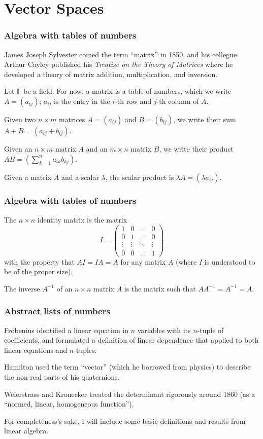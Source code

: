 \documentclass{beamer}
\theoremstyle{definition}
\begin{document}
\section{Vector Spaces}

\begin{frame}
    \frametitle{Algebra with tables of numbers}

    James Joseph Sylvester coined the term ``matrix'' in 1850, and his collegue Arthur Cayley published his \textit{Treatise on the Theory of Matrices}
    where he developed a theory of matrix addition, multiplication, and inversion.

    \pause
    Let $\mathbb{F}$ be a field. For now, a matrix is a table of numbers, which we write $A = (a_{ij})$; $a_{ij}$ is the entry in the $i$-th row and $j$-th column
    of $A$.

    \pause
    Given two $n \times m$ matrices $A = (a_{ij})$ and $B = (b_{ij})$, we write their sum $A + B = (a_{ij} + b_{ij})$.

    \pause
    Given an $n \times m$ matrix $A$ and an $m \times n$ matrix $B$, we write their product $AB = \left( \sum_{k=1}^n a_{ik} b_{kj} \right)$.

    \pause
    Given a matrix $A$ and a scalar $\lambda$, the scalar product is $\lambda A = (\lambda a_{ij})$.
\end{frame}

\begin{frame}
    \frametitle{Algebra with tables of numbers}

    The $n \times n$ identity matrix is the matrix
    \[
        I = \begin{pmatrix}
            1 & 0 & \ldots & 0 \\
            0 & 1 & \ldots & 0 \\
            \vdots & \vdots & \ddots & \vdots \\
            0 & 0 & \ldots & 1
        \end{pmatrix}  
    \]
    with the property that $AI = IA = A$ for any matrix $A$ (where $I$ is understood to be of the proper size).

    The inverse $A^{-1}$ of an $n \times n$ matrix $A$ is the matrix such that $A A^{-1} = A^{-1} = A$.
\end{frame}

\begin{frame}
    \frametitle{Abstract lists of numbers}
    Frobenius identified a linear equation in $n$ variables with its $n$-tuple of coefficients, and formulated a definition of linear dependence that
    applied to both linear equations and $n$-tuples.

    \pause
    Hamilton used the term ``vector'' (which he borrowed from physics) to describe the non-real parts of his quaternions.

    \pause
    Weierstrass and Kronecker treated the determinant rigorously around 1860 (as a ``normed, linear, homogeneous function'')\cite{hist-alg}.

    \pause
    For completeness's sake, I will include some basic definitions and results from linear algebra.
\end{frame}
\end{document}
